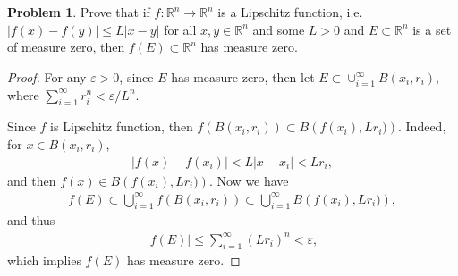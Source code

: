 \documentclass[11pt]{article}
\theoremstyle{definition}
\newtheorem{problem}{Problem}
\theoremstyle{definition}
\begin{document}
\medskip

\begin{problem}
Prove that if $f:\mathbb{R}^n\to\mathbb{R}^n$ is a Lipschitz function, i.e. $\left|f(x)-f(y)\right| \leq L \left|x - y\right|$ for all $x,y\in\mathbb{R}^n$ and some $L>0$ and $E\subset\mathbb{R}^n$ is a set of measure zero, then $f(E)\subset\mathbb{R}^n$ has measure zero.
\end{problem} 
\begin{proof}
For any $\varepsilon > 0$, since $E$ has measure zero, then let $E \subset \cup^\infty_{i=1} B(x_i, r_i)$, where $\sum^\infty_{i=1} r_i^n < \varepsilon/L^n$. 

Since $f$ is Lipschitz function, then $f \left(B(x_i, r_i)\right) \subset B \left(f(x_i), Lr_i)\right)$. Indeed, for $x \in B(x_i, r_i)$,
\begin{align*}
    \left|f(x) - f(x_i)\right| < L \left|x - x_i\right| < Lr_i,
\end{align*}
and then $f(x) \in B \left(f(x_i), Lr_i)\right)$. Now we have 
\begin{align*}
    f(E) \subset \bigcup^\infty_{i=1} f\left(B(x_i, r_i)\right) \subset \bigcup^\infty_{i=1} B \left(f(x_i), Lr_i)\right),
\end{align*}
and thus
\begin{align*}
    |f(E)| \leq \sum^\infty_{i=1} (Lr_i)^n < \varepsilon,
\end{align*}
which implies $f(E)$ has measure zero.
\end{proof}


\medskip
\end{document}
